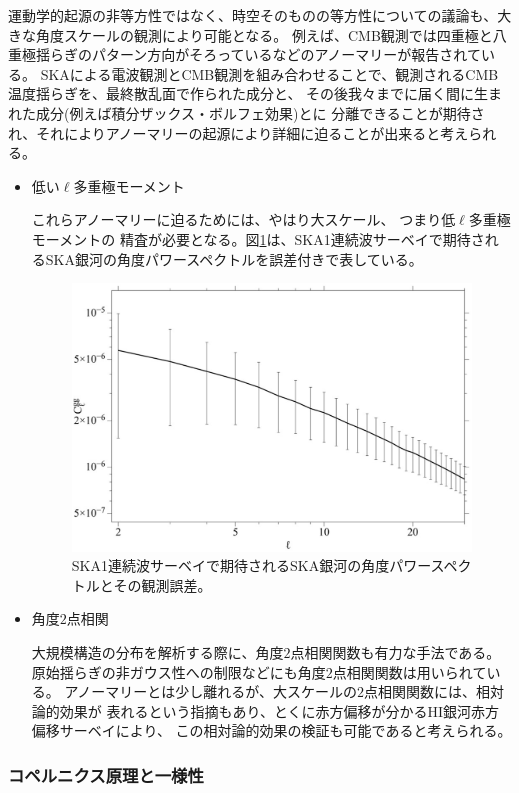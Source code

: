 運動学的起源の非等方性ではなく、時空そのものの等方性についての議論も、大きな角度スケールの観測により可能となる。
例えば、CMB観測では四重極と八重極揺らぎのパターン方向がそろっているなどのアノーマリーが報告されている。
SKAによる電波観測とCMB観測を組み合わせることで、観測されるCMB温度揺らぎを、最終散乱面で作られた成分と、
その後我々までに届く間に生まれた成分(例えば積分ザックス・ボルフェ効果)とに
分離できることが期待され、それによりアノーマリーの起源により詳細に迫ることが出来ると考えられる。

\begin{itemize}

\item 低い$\ell$多重極モーメント

これらアノーマリーに迫るためには、やはり大スケール、
つまり低$\ell$多重極モーメントの
精査が必要となる。図\ref{fig:low-ell}は、SKA1連続波サーベイで期待されるSKA銀河の角度パワースペクトルを誤差付きで表している。

\begin{figure}[tbp]\label{fig:fig.eps}
\begin{center}
\includegraphics[width=0.6\linewidth]{cosmology/foundation_fig.eps}
\end{center}
\caption{SKA1連続波サーベイで期待されるSKA銀河の角度パワースペクトルとその観測誤差。}
  \label{fig:low-ell}
\end{figure}

\item 角度$2$点相関

大規模構造の分布を解析する際に、角度$2$点相関関数も有力な手法である。
原始揺らぎの非ガウス性への制限などにも角度$2$点相関関数は用いられている。
アノーマリーとは少し離れるが、大スケールの$2$点相関関数には、相対論的効果が
表れるという指摘もあり、とくに赤方偏移が分かるHI銀河赤方偏移サーベイにより、
この相対論的効果の検証も可能であると考えられる。

\end{itemize}

\subsubsection{コペルニクス原理と一様性}

